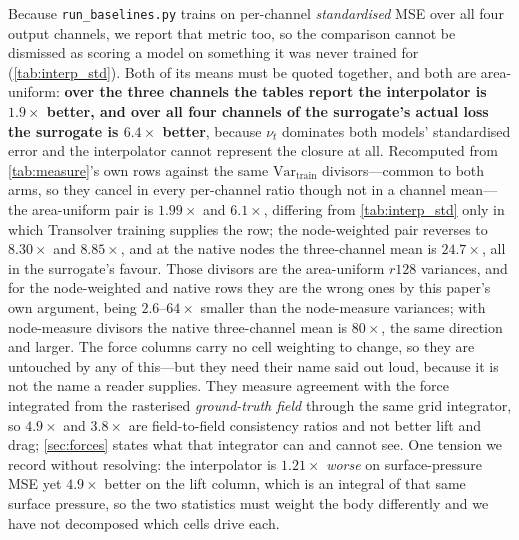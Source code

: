 Because \texttt{run\_baselines.py} trains on per-channel \emph{standardised} MSE over all
four output channels, we report that metric too, so the comparison cannot be dismissed as
scoring a model on something it was never trained for (\autoref{tab:interp_std}). Both of
its means must be quoted together, and both are area-uniform: \textbf{over the three
channels the tables report the interpolator is $1.9\times$ better, and over all four
channels of the surrogate's actual loss the surrogate is $6.4\times$ better}, because
$\nu_t$ dominates both models' standardised error and the interpolator cannot represent the
closure at all. Recomputed from \autoref{tab:measure}'s own rows against the same
$\mathrm{Var}_{\text{train}}$ divisors---common to both arms, so they cancel in every
per-channel ratio though not in a channel mean---the area-uniform pair is $1.99\times$ and
$6.1\times$, differing from \autoref{tab:interp_std} only in which Transolver training
supplies the row; the node-weighted pair reverses to $\mathbf{8.30\times}$ and $8.85\times$,
and at the native nodes the three-channel mean is $\mathbf{24.7\times}$, all in the
surrogate's favour. Those divisors are the area-uniform $r128$ variances, and for the
node-weighted and native rows they are the wrong ones by this paper's own argument, being
$2.6$--$64\times$ smaller than the node-measure variances; with node-measure divisors the
native three-channel mean is $80\times$, the same direction and larger. The force
columns carry no cell weighting to change, so they are untouched by any of this---but they
need their name said out loud, because it is not the name a reader supplies. They measure
agreement with the force integrated from the rasterised \emph{ground-truth field} through
the same grid integrator, so $4.9\times$ and $3.8\times$ are field-to-field consistency
ratios and not better lift and drag; \autoref{sec:forces} states what that integrator can
and cannot see. One tension we record without resolving: the interpolator is $1.21\times$
\emph{worse} on surface-pressure MSE yet $4.9\times$ better on the lift column, which is an
integral of that same surface pressure, so the two statistics must weight the body
differently and we have not decomposed which cells drive each.

